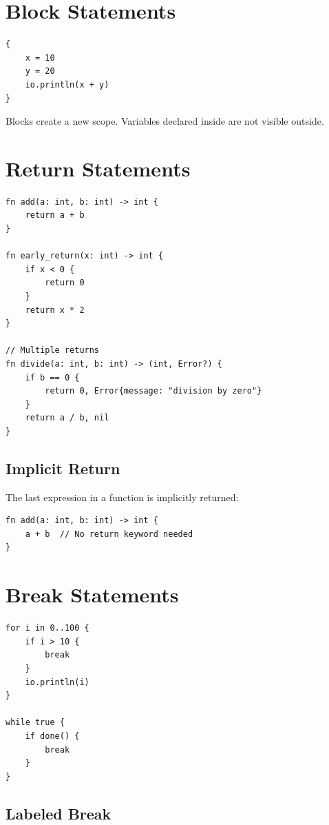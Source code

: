 \section{Block Statements}

\begin{lstlisting}
{
    x = 10
    y = 20
    io.println(x + y)
}
\end{lstlisting}

Blocks create a new scope. Variables declared inside are not visible outside.

\section{Return Statements}

\begin{lstlisting}
fn add(a: int, b: int) -> int {
    return a + b
}

fn early_return(x: int) -> int {
    if x < 0 {
        return 0
    }
    return x * 2
}

// Multiple returns
fn divide(a: int, b: int) -> (int, Error?) {
    if b == 0 {
        return 0, Error{message: "division by zero"}
    }
    return a / b, nil
}
\end{lstlisting}

\subsection{Implicit Return}

The last expression in a function is implicitly returned:

\begin{lstlisting}
fn add(a: int, b: int) -> int {
    a + b  // No return keyword needed
}
\end{lstlisting}

\section{Break Statements}

\begin{lstlisting}
for i in 0..100 {
    if i > 10 {
        break
    }
    io.println(i)
}

while true {
    if done() {
        break
    }
}
\end{lstlisting}

\subsection{Labeled Break}


